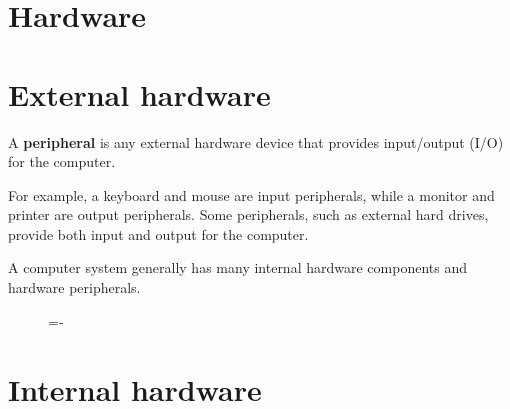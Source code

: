 \documentclass[a4paper]{systems-software}
\begin{document}
\section{Hardware}

\section*{External hardware}

A \textbf{peripheral} is any external hardware device that provides input/output (I/O) for the computer.

For example, a keyboard and mouse are input peripherals, while a monitor and printer are output peripherals. Some peripherals, such as external hard drives, provide both input and output for the computer.

A computer system generally has many internal hardware components and hardware peripherals.

\begin{figure}[H]
  \lineskip=-\fboxrule
\end{figure}

\section*{Internal hardware}
\end{document}
